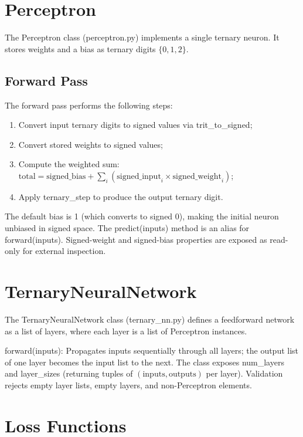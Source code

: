 \documentclass[12pt,a4paper,twoside]{book}
\theoremstyle{trinarytheorem}
\theoremstyle{trinarydefinition}
\newcommand{\code}[1]{\textsf{#1}}
\begin{document}
\section{Perceptron}

The \code{Perceptron} class (\code{perceptron.py}) implements a single
ternary neuron. It stores weights and a bias as ternary digits
$\{0,1,2\}$.

\subsection{Forward Pass}

The forward pass performs the following steps:
\begin{enumerate}
    \item Convert input ternary digits to signed values via
          \code{trit\_to\_signed};
    \item Convert stored weights to signed values;
    \item Compute the weighted sum:
          $\text{total} = \text{signed\_bias} + \sum_i
          (\text{signed\_input}_i \times \text{signed\_weight}_i)$;
    \item Apply \code{ternary\_step} to produce the output ternary digit.
\end{enumerate}

The default bias is 1 (which converts to signed 0), making the initial
neuron unbiased in signed space. The \code{predict(inputs)} method is
an alias for \code{forward(inputs)}. Signed-weight and signed-bias
properties are exposed as read-only for external inspection.

\section{TernaryNeuralNetwork}

The \code{TernaryNeuralNetwork} class (\code{ternary\_nn.py}) defines
a feedforward network as a list of layers, where each layer is a list of
\code{Perceptron} instances.

\noindent\code{forward(inputs)}: Propagates inputs sequentially through
all layers; the output list of one layer becomes the input list to the
next. The class exposes \code{num\_layers} and
\code{layer\_sizes} (returning tuples of $(\text{inputs}, \text{outputs})$
per layer). Validation rejects empty layer lists, empty layers, and
non-Perceptron elements.

\section{Loss Functions}
\end{document}
